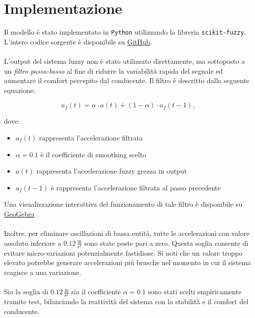 \chapter{Implementazione}

Il modello è stato implementato in \texttt{Python} utilizzando la libreria \texttt{scikit-fuzzy}.  
L'intero codice sorgente è disponibile su \href{https://github.com/Leso246/FuzzyACC}{GitHub}.
\\\\
\noindent L'output del sistema fuzzy non è stato utilizzato direttamente, ma sottoposto a un \emph{filtro passa-basso} 
al fine di ridurre la variabilità rapida del segnale ed aumentare il comfort percepito dal conducente.  
Il filtro è descritto dalla seguente equazione:

\[
a_{f}(t) = \alpha \cdot a(t) + (1 - \alpha) \cdot a_{f}(t-1),
\]

\noindent dove:
\begin{itemize}
    \item $a_{f}(t)$ rappresenta l'accelerazione filtrata
    \item $\alpha = 0.1$ è il coefficiente di smoothing scelto
    \item $a(t)$ rappresenta l'accelerazione fuzzy grezza in output
    \item $a_{f}(t-1)$ è rappresenta l'accelerazione filtrata al passo precedente
\end{itemize}
Una visualizzazione interattiva del funzionamento di tale filtro è disponibile 
su \href{https://www.geogebra.org/m/tb88mqrm}{GeoGebra} \cite{geogebraEWMA}.
\\\\
\noindent Inoltre, per eliminare oscillazioni di bassa entità, tutte le accelerazioni con valore assoluto inferiore a $0.12 \, \frac{\mathrm{m}}{\mathrm{s^2}}$ 
sono state poste pari a zero.  
Questa soglia consente di evitare micro-variazioni potenzialmente fastidiose. Si noti che un valore troppo elevato potrebbe
generare accelerazioni più brusche nel momento in cui il sistema reagisce a una variazione.
\\\\
\noindent Sia la soglia di $0.12 \,\frac{\mathrm{m}}{\mathrm{s^2}}$ sia il coefficiente $\alpha = 0.1$ sono stati scelti empiricamente tramite test, 
bilanciando la reattività del sistema con la stabilità e il comfort del conducente.

